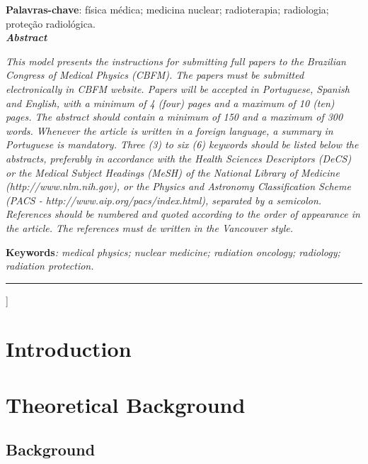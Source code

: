 \documentclass[10pt,twoside,twocolumn]{article}
\begin{document}
\begin{@twocolumnfalse}
\textbf{Palavras-chave}: f\'{i}sica m\'{e}dica; medicina nuclear; radioterapia; radiologia; prote\c{c}\~{a}o radiol\'{o}gica.\\



\textbf{\textit{Abstract}}

\textit{This model presents the instructions for submitting full papers to the Brazilian Congress of Medical Physics (CBFM). The papers must be submitted electronically in CBFM website. Papers will be accepted in Portuguese, Spanish and English, with a minimum of 4 (four) pages and a maximum of 10 (ten) pages. The abstract should contain a minimum of 150 and a maximum of 300 words. Whenever the article is written in a foreign language, a summary in Portuguese is mandatory. Three (3) to six (6) keywords should be listed below the abstracts, preferably in accordance with the Health Sciences Descriptors (DeCS) or the Medical Subject Headings (MeSH) of the National Library of Medicine (http://www.nlm.nih.gov), or the Physics and Astronomy Classification Scheme (PACS - http://www.aip.org/pacs/index.html), separated by a semicolon. References should be numbered and quoted according to the order of appearance in the article. The references must de written in the Vancouver style.}

\textbf{Keywords}\textit{: medical physics; nuclear medicine; radiation oncology; radiology; radiation protection.} 
\noindent\rule{17.2cm}{0.4pt}
\vspace{\baselineskip}
    \end{@twocolumnfalse}
 ]
 
 
 
\section{Introduction}

\lipsum

\section{Theoretical Background}
\subsection{Background}
\end{document}
